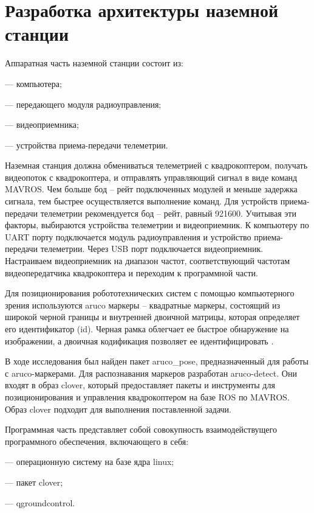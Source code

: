 \section{Разработка архитектуры наземной станции}
Аппаратная часть наземной станции состоит из:

--- компьютера;

--- передающего модуля радиоуправления;

--- видеоприемника;

--- устройства приема-передачи телеметрии.

Наземная станция должна обмениваться телеметрией с квадрокоптером, получать видеопоток с квадрокоптера, и отправлять управляющий сигнал в виде команд MAVROS. Чем больше бод -- рейт подключенных модулей и меньше задержка сигнала, тем быстрее осуществляется выполнение команд. Для устройств приема-передачи телеметрии рекомендуется бод -- рейт, равный 921600. Учитывая эти факторы, выбираются устройства телеметрии и видеоприемник.
К компьютеру по UART порту подключается модуль радиоуправления и устройство приема-передачи телеметрии. Через USB порт подключается видеоприемник. Настраиваем видеоприемник на диапазон частот, соответствующий частотам видеопередатчика квадрокоптера и переходим к программной части.

Для позиционирования робототехнических систем с помощью компьютерного зрения используются aruco маркеры -- квадратные маркеры, состоящий из широкой черной границы и внутренней двоичной матрицы, которая определяет его идентификатор (id). Черная рамка облегчает ее быстрое обнаружение на изображении, а двоичная кодификация позволяет ее идентифицировать \cite{opencv}.

В ходе исследования был найден пакет aruco\_pose, предназначенный для работы с aruco-маркерами. Для распознавания маркеров разработан aruco-detect. Они входят в образ clover, который предоставляет пакеты и инструменты для позиционирования и управления квадрокоптером на базе ROS по MAVROS. Образ clover подходит для выполнения поставленной задачи.

Программная часть представляет собой совокупность взаимодействущего программного обеспечения, включающего в себя:

--- операционную систему на базе ядра linux;

--- пакет clover;

--- qgroundcontrol.

